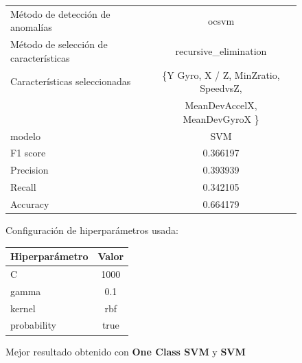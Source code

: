 \begin{appendices}
		\begin{figure}[htb]
			\centering
			\caption{Mejor resultado obtenido con \textbf{One Class SVM} y \textbf{SVM}}
			\label{table:28}
			\begin{tabular}{lc}
				\toprule
				\midrule
					  Método de detección de anomalías &                                              ocsvm \\
				Método de selección de características &                              recursive\_elimination \\
						 Características seleccionadas & \{Y Gyro, X / Z, MinZratio, SpeedvsZ,   \\ 
						 							   &   MeanDevAccelX, MeanDevGyroX \}\\
												modelo &                                                SVM \\
											  F1 score &                                           0.366197 \\
											 Precision &                                           0.393939 \\
												Recall &                                           0.342105 \\
											  Accuracy &                                           0.664179 \\
				\bottomrule
			\end{tabular}
			\newline
			\newline
			Configuración de hiperparámetros usada:
			\begin{tabular}{lc}
				\toprule
				Hiperparámetro & Valor \\
				\midrule
							 C &  1000 \\
						 gamma &   0.1 \\
						kernel &   rbf \\
				   probability &  true \\
				\bottomrule
			\end{tabular}
			
		\end{figure}


\end{appendices}
